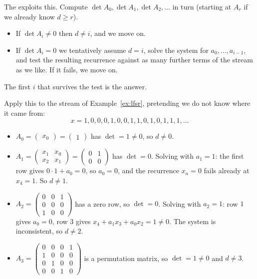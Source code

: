 The  exploits this. Compute $\det A_0, \det A_1, \det A_2, \dots$ in turn (starting at $A_r$ if we already know $d \ge r$).
\begin{itemize}
	\item If $\det A_i \ne 0$ then $d \ne i$, and we move on.
	\item If $\det A_i = 0$ we tentatively assume $d = i$, solve the system for $a_0,\dots,a_{i-1}$, and test the resulting recurrence against as many further terms of the stream as we like. If it fails, we move on.
\end{itemize}
The first $i$ that survives the test is the answer.

\begin{example}
	Apply this to the stream of Example~\ref{ex:lfsr}, pretending we do not know where it came from:
	$$x = 1,0,0,0,1,0,0,1,1,0,1,0,1,1,1,\dots$$
	\begin{itemize}
		\item $A_0 = \begin{pmatrix}x_0\end{pmatrix} = \begin{pmatrix}1\end{pmatrix}$ has $\det = 1 \ne 0$, so $d \ne 0$.
		\item $A_1 = \begin{pmatrix}x_1 & x_0\\ x_2 & x_1\end{pmatrix} = \begin{pmatrix}0&1\\0&0\end{pmatrix}$ has $\det = 0$. Solving with $a_1 = 1$: the first row gives $0\cdot1 + a_0 = 0$, so $a_0 = 0$, and the recurrence $x_n = 0$ fails already at $x_4 = 1$. So $d \ne 1$.
		\item $A_2 = \begin{pmatrix}0&0&1\\0&0&0\\1&0&0\end{pmatrix}$ has a zero row, so $\det = 0$. Solving with $a_2=1$: row $1$ gives $a_0 = 0$, row $3$ gives $x_4 + a_1x_3+a_0x_2 = 1 \ne 0$. The system is inconsistent, so $d\ne2$.
		\item $A_3 = \begin{pmatrix}0&0&0&1\\1&0&0&0\\0&1&0&0\\0&0&1&0\end{pmatrix}$ is a permutation matrix, so $\det = 1\ne0$ and $d \ne 3$.

\end{itemize}
\end{example}
